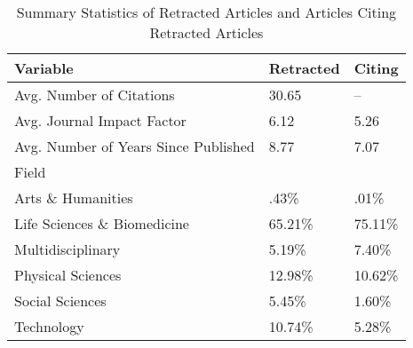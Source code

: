 \begin{table}[!htb]
\centering
\begin{tabular}{lll}
  \hline
Variable & Retracted & Citing \\ 
  \hline
Avg. Number of Citations & 30.65 & -- \\ 
  Avg. Journal Impact Factor & 6.12 & 5.26 \\ 
  Avg. Number of Years Since Published & 8.77 & 7.07 \\ 
  Field &  &  \\ 
  Arts \& Humanities & .43\% & .01\% \\ 
  Life Sciences \& Biomedicine & 65.21\% & 75.11\% \\ 
  Multidisciplinary & 5.19\% & 7.40\% \\ 
  Physical Sciences & 12.98\% & 10.62\% \\ 
  Social Sciences & 5.45\% & 1.60\% \\ 
  Technology & 10.74\% & 5.28\% \\ 
   \hline
\end{tabular}
\caption{Summary Statistics of Retracted Articles and Articles Citing Retracted Articles} 
\label{tab:recite_ret_sum}
\end{table}
